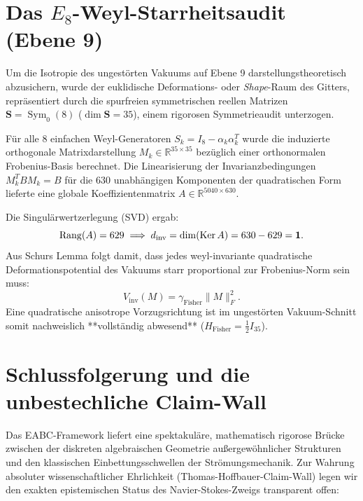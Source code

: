 \documentclass[11pt,twoside,a4paper]{article}
\begin{document}
	\section{Das $E_8$-Weyl-Starrheitsaudit (Ebene 9)}
	Um die Isotropie des ungestörten Vakuums auf Ebene 9 darstellungstheoretisch abzusichern, wurde der euklidische Deformations- oder \textit{Shape}-Raum des Gitters, repräsentiert durch die spurfreien symmetrischen reellen Matrizen $\mathbf{S} = \operatorname{Sym}_0(8)$ ($\dim \mathbf{S} = 35$), einem rigorosen Symmetrieaudit unterzogen.
	
	Für alle 8 einfachen Weyl-Generatoren $S_k = I_8 - \alpha_k \alpha_k^T$ wurde die induzierte orthogonale Matrixdarstellung $M_k \in \mathbb{R}^{35 \times 35}$ bezüglich einer orthonormalen Frobenius-Basis berechnet. Die Linearisierung der Invarianzbedingungen $M_k^T B M_k = B$ für die $630$ unabhängigen Komponenten der quadratischen Form lieferte eine globale Koeffizientenmatrix $A \in \mathbb{R}^{5040 \times 630}$.
	
	Die Singulärwertzerlegung (SVD) ergab:
	\begin{equation}
		\operatorname{Rang}(A) = 629 \implies d_{\rm inv} = \dim(\operatorname{Ker} A) = 630 - 629 = \mathbf{1}.
	\end{equation}
	Aus Schurs Lemma folgt damit, dass jedes weyl-invariante quadratische Deformationspotential des Vakuums starr proportional zur Frobenius-Norm sein muss:
	\begin{equation}
		V_{\text{inv}}(M) = \gamma_{\text{Fisher}} \|M\|_F^2.
	\end{equation}
	Eine quadratische anisotrope Vorzugsrichtung ist im ungestörten Vakuum-Schnitt somit nachweislich **vollständig abwesend** ($H_{\text{Fisher}} = \frac{1}{2} I_{35}$).
	
	\section{Schlussfolgerung und die unbestechliche Claim-Wall}
	Das EABC-Framework liefert eine spektakuläre, mathematisch rigorose Brücke zwischen der diskreten algebraischen Geometrie außergewöhnlicher Strukturen und den klassischen Einbettungsschwellen der Strömungsmechanik. Zur Wahrung absoluter wissenschaftlicher Ehrlichkeit (Thomas-Hoffbauer-Claim-Wall) legen wir den exakten epistemischen Status des Navier-Stokes-Zweigs transparent offen:
	
\end{document}
